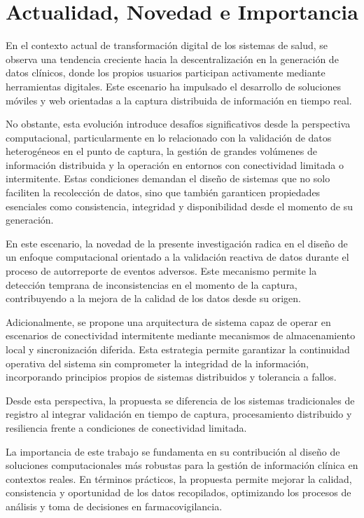 \section{Actualidad, Novedad e Importancia}\label{section:actualidadNovedadImportancia}

En el contexto actual de transformación digital de los sistemas de salud, se observa una tendencia creciente hacia la descentralización en la generación de datos clínicos, donde los propios usuarios participan activamente mediante herramientas digitales. Este escenario ha impulsado el desarrollo de soluciones móviles y web orientadas a la captura distribuida de información en tiempo real.

No obstante, esta evolución introduce desafíos significativos desde la perspectiva computacional, particularmente en lo relacionado con la validación de datos heterogéneos en el punto de captura, la gestión de grandes volúmenes de información distribuida y la operación en entornos con conectividad limitada o intermitente. Estas condiciones demandan el diseño de sistemas que no solo faciliten la recolección de datos, sino que también garanticen propiedades esenciales como consistencia, integridad y disponibilidad desde el momento de su generación.

En este escenario, la novedad de la presente investigación radica en el diseño de un enfoque computacional orientado a la validación reactiva de datos durante el proceso de autorreporte de eventos adversos. Este mecanismo permite la detección temprana de inconsistencias en el momento de la captura, contribuyendo a la mejora de la calidad de los datos desde su origen.

Adicionalmente, se propone una arquitectura de sistema capaz de operar en escenarios de conectividad intermitente mediante mecanismos de almacenamiento local y sincronización diferida. Esta estrategia permite garantizar la continuidad operativa del sistema sin comprometer la integridad de la información, incorporando principios propios de sistemas distribuidos y tolerancia a fallos.

Desde esta perspectiva, la propuesta se diferencia de los sistemas tradicionales de registro al integrar validación en tiempo de captura, procesamiento distribuido y resiliencia frente a condiciones de conectividad limitada.

La importancia de este trabajo se fundamenta en su contribución al diseño de soluciones computacionales más robustas para la gestión de información clínica en contextos reales. En términos prácticos, la propuesta permite mejorar la calidad, consistencia y oportunidad de los datos recopilados, optimizando los procesos de análisis y toma de decisiones en farmacovigilancia.


